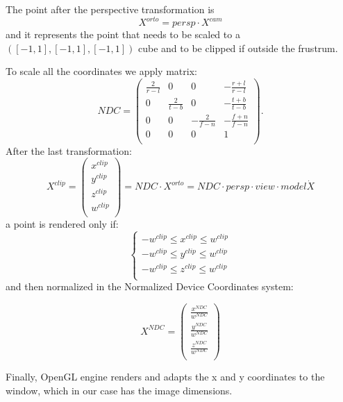 The point after the perspective transformation is
\begin{equation}
 X^{orto} = persp \cdot X^{cam}
\end{equation}
and it represents the point that needs to be scaled to a $([-1,1], [-1,1], [-1,1])$ cube and to be clipped if outside the frustrum.

To scale all the coordinates we apply matrix:
\begin{equation}
 NDC =
 \begin{pmatrix}
  \frac{2}{r-l}   &             0   & 0               & -\frac{r+l}{r-l}\\
  0               & \frac{2}{t-b}  & 0               & -\frac{t+b}{t-b}\\
  0               & 0               & -\frac{2}{f-n}  & -\frac{f+n}{f-n}\\
  0               & 0               & 0               & 1\\
 \end{pmatrix}.
\end{equation}
After the last transformation:
\begin{equation}
 X^{clip} = 
 \begin{pmatrix}
  x^{clip}\\
  y^{clip}\\
  z^{clip}\\
  w^{clip}\\
 \end{pmatrix}
 = NDC \cdot X^{orto} = NDC \cdot persp \cdot view \cdot model \dot X
\end{equation}
a point is rendered  only if:
\begin{equation}
 \begin{cases}
  -w^{clip} \leq x^{clip} \leq w^{clip}\\
  -w^{clip} \leq y^{clip} \leq w^{clip}\\
  -w^{clip} \leq z^{clip} \leq w^{clip}\\
 \end{cases}
\end{equation}
and then normalized in the Normalized Device Coordinates system:

\begin{equation}
 X^{NDC} = 
 \begin{pmatrix}
  \frac{x^{NDC}}{w^{NDC}}\\
  \frac{y^{NDC}}{w^{NDC}}\\
  \frac{z^{NDC}}{w^{NDC}}\\
 \end{pmatrix}
\end{equation}


Finally, OpenGL engine renders and adapts the x and y coordinates to the window, which in our case has the image dimensions.








